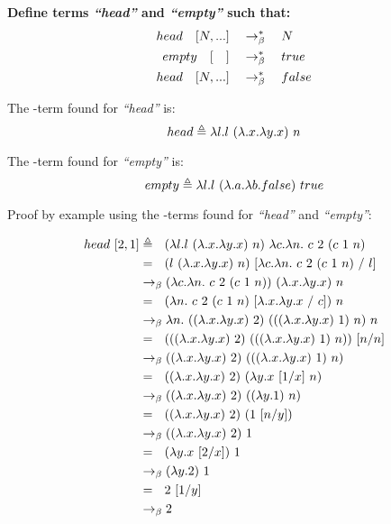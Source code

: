 \documentclass{article}
\begin{document}
	\begin{Large}
		\textbf{Define terms \textit{``head''} and \textit{``empty''} such that:}
		\begin{align*}
			head \quad [ N, ...] &\quad \rightarrow_\beta^*\quad  N\\
			empty \quad [\quad] &\quad \rightarrow_\beta^*\quad true\\
			head \quad [ N, ...] &\quad \rightarrow_\beta^*\quad false
		\end{align*}
		\newline
		
		The \lamb -term found for \textit{``head''} is:
		\begin{equation*}
			head \triangleq \la l.l \ (\la .x.\la y.x) \ n
		\end{equation*}
		
		The \lamb -term found for \textit{``empty''} is:
		\begin{equation*}
			empty \triangleq \la l.l \ (\la .a.\la b.false) \ true
		\end{equation*}
		\newline
		
		Proof by example using the \lamb -terms found for  \textit{``head''} and \textit{``empty''}:
		
		\begin{align*}
			head \ [2,1] &\triangleq \saq (\la l.l \ (\la .x.\la y.x) \ n) \ \la c.\la n. \ c \ 2 \ (c \ 1 \ n) \\
			&= \saq (l \ (\la .x.\la y.x) \ n) \ [\la c.\la n. \ c \ 2 \ (c \ 1 \ n) \ / \ l] \\
			&\equals (\la c.\la n. \ c \ 2 \ (c \ 1 \ n)) \ (\la .x.\la y.x) \ n \\
			&= \saq (\la n. \ c \ 2 \ (c \ 1 \ n) \ [\la .x.\la y.x \ / \ c] ) \ n \\
			&\equals \la n.\ ((\la .x.\la y.x) \ 2) \ (((\la .x.\la y.x) \ 1) \ n) \ n \\
			&= \saq (((\la .x.\la y.x) \ 2) \ (((\la .x.\la y.x) \ 1) \ n)) \ [n / n] \\
			&\equals ((\la .x.\la y.x) \ 2) \ (((\la .x.\la y.x) \ 1) \ n) \\
			&= \saq ((\la .x.\la y.x) \ 2) \ (\la y.x \ [1 / x] \ n) \\
			&\equals ((\la .x.\la y.x) \ 2) \ ((\la y.1 ) \ n) \\
			&= \saq ((\la .x.\la y.x) \ 2) \ (1 \ [n/y]) \\
			&\equals ((\la .x.\la y.x) \ 2) \ 1 \\
			&= \saq (\la y.x\ [2/x]) \ 1 \\
			&\equals (\la y.2) \ 1 \\
			&= \saq 2 \ [1/y] \\
			&\equals 2
		\end{align*}
		

\end{Large}
\end{document}
